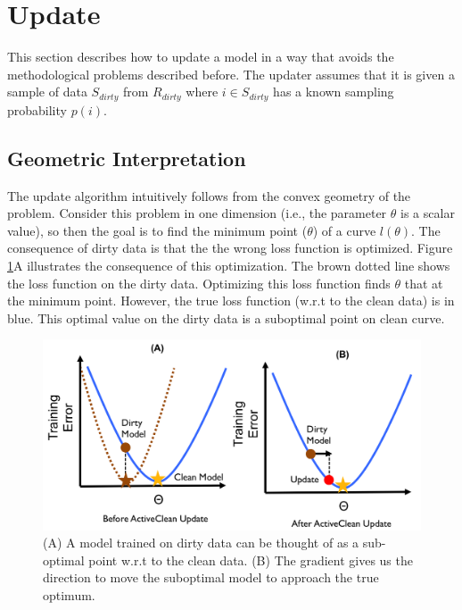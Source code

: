 \section{Update}\label{model-update}
This section describes how to update a model in a way that avoids the methodological problems described before.
The updater assumes that it is given a sample of data $S_{dirty}$ from $R_{dirty}$ where $i \in S_{dirty}$ has a known sampling probability $p(i)$.

\subsection{Geometric Interpretation}
The update algorithm intuitively follows from the convex geometry of the problem.
Consider this problem in one dimension (i.e., the parameter $\theta$ is a scalar value), so then the goal is to find the minimum point ($\theta$) of a curve $l(\theta)$.
The consequence of dirty data is that the the wrong loss function is optimized.
Figure \ref{update-arch2}A illustrates the consequence of this optimization.
The brown dotted line shows the loss function on the dirty data.
Optimizing this loss function finds $\theta$ that at the minimum point.
However, the true loss function (w.r.t to the clean data) is in blue.
This optimal value on the dirty data is a suboptimal point on clean curve.

\begin{figure}[ht!]
\centering
 \includegraphics[width=\columnwidth]{figs/update-arch2.png}\vspace{-1em}
 \caption{(A) A model trained on dirty data can be thought of as a sub-optimal point w.r.t to the clean data. (B) The gradient gives us the direction to move the suboptimal model to approach the true optimum. \label{update-arch2}}\vspace{-1em}
\end{figure}

